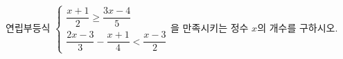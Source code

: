 연립부등식 $\begin{cases} \dfrac{x+1}{2}\ge \dfrac{3x-4}{5} \\[6pt] \dfrac{2x-3}{3}-\dfrac{x+1}{4}<\dfrac{x-3}{2} \end{cases}$을 만족시키는 정수 $x$의 개수를 구하시오.
